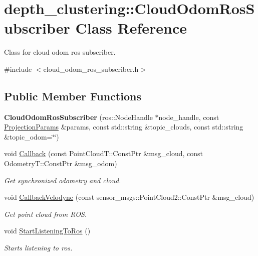 \hypertarget{classdepth__clustering_1_1CloudOdomRosSubscriber}{}\section{depth\+\_\+clustering\+:\+:Cloud\+Odom\+Ros\+Subscriber Class Reference}
\label{classdepth__clustering_1_1CloudOdomRosSubscriber}


Class for cloud odom ros subscriber.  




{\ttfamily \#include $<$cloud\+\_\+odom\+\_\+ros\+\_\+subscriber.\+h$>$}

\subsection*{Public Member Functions}
\begin{DoxyCompactItemize}
\item 
\mbox{\label{classdepth__clustering_1_1CloudOdomRosSubscriber_a01d66910b5dfe1d1145a8d68645bd7b4}} 
{\bfseries Cloud\+Odom\+Ros\+Subscriber} (ros\+::\+Node\+Handle $\ast$node\+\_\+handle, const \hyperlink{classdepth__clustering_1_1ProjectionParams}{Projection\+Params} \&params, const std\+::string \&topic\+\_\+clouds, const std\+::string \&topic\+\_\+odom=\char`\"{}\char`\"{})
\item 
void \hyperlink{classdepth__clustering_1_1CloudOdomRosSubscriber_a76a7474f1deed190ac2fb57084c4cdb9}{Callback} (const Point\+Cloud\+T\+::\+Const\+Ptr \&msg\+\_\+cloud, const Odometry\+T\+::\+Const\+Ptr \&msg\+\_\+odom)
\begin{DoxyCompactList}\small\item\em Get synchronized odometry and cloud. \end{DoxyCompactList}\item 
void \hyperlink{classdepth__clustering_1_1CloudOdomRosSubscriber_a8de806bc0b847229dcc92c504908f019}{Callback\+Velodyne} (const sensor\+\_\+msgs\+::\+Point\+Cloud2\+::\+Const\+Ptr \&msg\+\_\+cloud)
\begin{DoxyCompactList}\small\item\em Get point cloud from R\+OS. \end{DoxyCompactList}\item 
\mbox{\label{classdepth__clustering_1_1CloudOdomRosSubscriber_a16020c63b14308591cae6f4a9ba9b29a}} 
void \hyperlink{classdepth__clustering_1_1CloudOdomRosSubscriber_a16020c63b14308591cae6f4a9ba9b29a}{Start\+Listening\+To\+Ros} ()
\begin{DoxyCompactList}\small\item\em Starts listening to ros. \end{DoxyCompactList}\end{DoxyCompactItemize}

